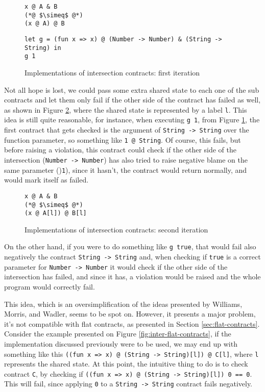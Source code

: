 \documentclass[sigplan,10pt,review,anonymous]{acmart}
\newcommand{\nickel}[1]{\lstinline[language=nickel]{#1}}
\begin{document}
\begin{figure}[h]
\begin{lstlisting}[language=nickel, title=Implementation]
x @ A & B
(*@ $\simeq$ @*)
(x @ A) @ B
\end{lstlisting}
\begin{lstlisting}[language=nickel, title=Problem]
let g = (fun x => x) @ (Number -> Number) & (String -> String) in
g 1
\end{lstlisting}
\caption{Implementations of intersection contracts: first iteration}
\label{fig:inter-contracts}
\end{figure}

Not all hope is lost, we could pass some extra shared state
to each one of the sub contracts and let them only fail if the other
side of the contract has failed as well, as shown in Figure
\ref{fig:inter-contracts-2}, where the shared state is
represented by a label \nickel{l}.
This idea is still quite reasonable, for instance, when executing
\nickel{g 1}, from Figure \ref{fig:inter-contracts}, the first contract
that gets checked is the argument of \nickel{String -> String} over the function parameter, so
something like \nickel{1 @ String}.
Of course, this fails, but before raising a violation, this contract could
check if the other side of the intersection (\nickel{Number -> Number}) has
also tried to raise negative blame on the same parameter ()\nickel{1}), since
it hasn't, the contract would return normally, and would mark itself as failed.

\begin{figure}[h]
\begin{lstlisting}[language=nickel, title=Implementation]
x @ A & B
(*@ $\simeq$ @*)
(x @ A[l]) @ B[l]
\end{lstlisting}
\caption{Implementations of intersection contracts: second iteration}
\label{fig:inter-contracts-2}
\end{figure}

On the other hand, if you were to do something like
\nickel{g true}, that would fail also negatively the contract
\nickel{String -> String} and, when checking if \nickel{true}
is a correct parameter for \nickel{Number -> Number} it would check
if the other side of the intersection has failed, and since it
has, a violation would be raised and the whole program would
correctly fail.

This idea, which is an oversimplification of the ideas
presented by Williams, Morris, and Wadler, seems to be spot on.
However, it presents a major problem, it's not compatible with flat contracts,
as presented in Section \ref{sec:flat-contracts}.
Consider the example presented on Figure \ref{fig:inter-flat-contracts},
if the implementation discussed previously were to be used, we may end up with
something like this \nickel{((fun x => x) @ (String -> String)[l]) @ C[l]}, where
\nickel{l} represents the shared state.
At this point, the intuitive thing to do is to check contract \nickel{C}, by checking
if \nickel{((fun x => x) @ (String -> String)[l]) 0 == 0}.
This will fail, since applying \nickel{0} to a \nickel{String -> String} contract
fails negatively.
\end{document}
